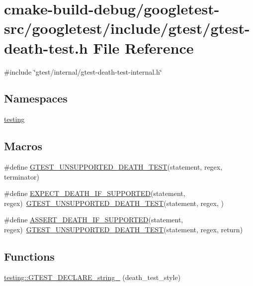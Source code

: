 \hypertarget{gtest-death-test_8h}{}\section{cmake-\/build-\/debug/googletest-\/src/googletest/include/gtest/gtest-\/death-\/test.h File Reference}
\label{gtest-death-test_8h}
{\ttfamily \#include \char`\"{}gtest/internal/gtest-\/death-\/test-\/internal.\+h\char`\"{}}\newline
\subsection*{Namespaces}
\begin{DoxyCompactItemize}
\item 
 \mbox{\hyperlink{namespacetesting}{testing}}
\end{DoxyCompactItemize}
\subsection*{Macros}
\begin{DoxyCompactItemize}
\item 
\#define \mbox{\hyperlink{gtest-death-test_8h_aa5f42ab29859b7f49a901770d2e66855}{G\+T\+E\+S\+T\+\_\+\+U\+N\+S\+U\+P\+P\+O\+R\+T\+E\+D\+\_\+\+D\+E\+A\+T\+H\+\_\+\+T\+E\+ST}}(statement,  regex,  terminator)
\item 
\#define \mbox{\hyperlink{gtest-death-test_8h_a8564de0e012dd0898949c513d1571f8b}{E\+X\+P\+E\+C\+T\+\_\+\+D\+E\+A\+T\+H\+\_\+\+I\+F\+\_\+\+S\+U\+P\+P\+O\+R\+T\+ED}}(statement,  regex)~\mbox{\hyperlink{gtest-death-test_8h_aa5f42ab29859b7f49a901770d2e66855}{G\+T\+E\+S\+T\+\_\+\+U\+N\+S\+U\+P\+P\+O\+R\+T\+E\+D\+\_\+\+D\+E\+A\+T\+H\+\_\+\+T\+E\+ST}}(statement, regex, )
\item 
\#define \mbox{\hyperlink{gtest-death-test_8h_ab2f0f25b46353767179a49ebd15b7345}{A\+S\+S\+E\+R\+T\+\_\+\+D\+E\+A\+T\+H\+\_\+\+I\+F\+\_\+\+S\+U\+P\+P\+O\+R\+T\+ED}}(statement,  regex)~\mbox{\hyperlink{gtest-death-test_8h_aa5f42ab29859b7f49a901770d2e66855}{G\+T\+E\+S\+T\+\_\+\+U\+N\+S\+U\+P\+P\+O\+R\+T\+E\+D\+\_\+\+D\+E\+A\+T\+H\+\_\+\+T\+E\+ST}}(statement, regex, return)
\end{DoxyCompactItemize}
\subsection*{Functions}
\begin{DoxyCompactItemize}
\item 
\mbox{\hyperlink{namespacetesting_a37b7e87f0a5f502c6918f37d1768c1f3}{testing\+::\+G\+T\+E\+S\+T\+\_\+\+D\+E\+C\+L\+A\+R\+E\+\_\+string\+\_\+}} (death\+\_\+test\+\_\+style)
\end{DoxyCompactItemize}


